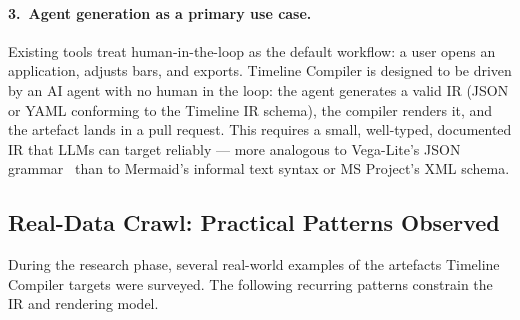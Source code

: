 \paragraph{3.\ Agent generation as a primary use case.}
Existing tools treat human-in-the-loop as the default workflow: a user
opens an application, adjusts bars, and exports.
Timeline Compiler is designed to be driven by an AI agent with no human in
the loop: the agent generates a valid IR (JSON or YAML conforming to the
Timeline IR schema), the compiler renders it, and the artefact lands in
a pull request.
This requires a small, well-typed, documented IR that LLMs can target
reliably --- more analogous to Vega-Lite's JSON grammar~\cite{vegalite2017}
than to Mermaid's informal text syntax or MS Project's XML schema.

\subsection{Real-Data Crawl: Practical Patterns Observed}
\label{sec:comparison-patterns}

During the research phase, several real-world examples of the artefacts
Timeline Compiler targets were surveyed.
The following recurring patterns constrain the IR and rendering model.

